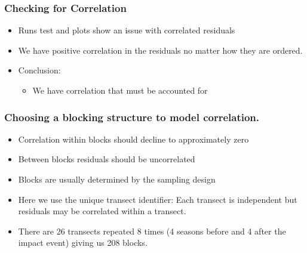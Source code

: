 \begin{frame}
\frametitle{Checking for Correlation}
\begin{itemize}
\item Runs test and plots show an issue with correlated residuals
\item We have positive correlation in the residuals no matter how they are ordered.
\pause
\item Conclusion:  
\begin{itemize}
  \item We have correlation that must be accounted for
\end{itemize}
\end{itemize}
\end{frame}

\begin{frame}
\frametitle{Choosing a blocking structure to model correlation.}
\begin{itemize}
\item Correlation within blocks should decline to approximately zero 
\item Between blocks residuals should be uncorrelated
\item Blocks are usually determined by the sampling design
\item Here we use the unique transect identifier: Each transect is independent but residuals may be correlated within a transect.
\item There are 26 transects repeated 8 times (4 seasons before and 4 after the impact event) giving us 208 blocks.
\end{itemize}
\end{frame}


